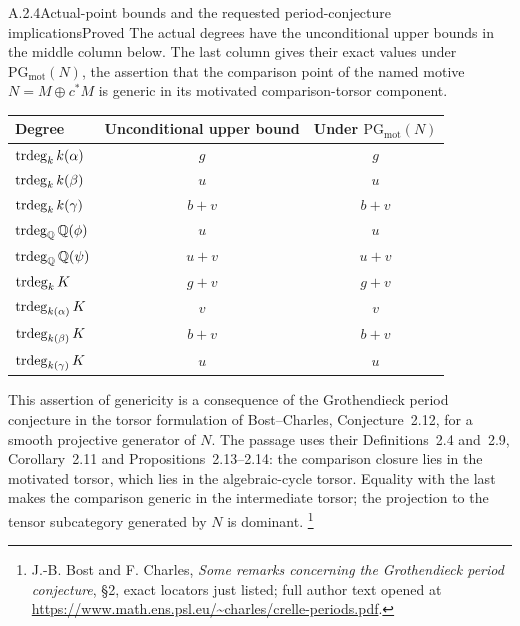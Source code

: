 \begin{result}{A.2.4}{Actual-point bounds and the requested period-conjecture implications}{Proved}
The actual degrees have the unconditional upper bounds in the middle
column below. The last column gives their exact values under
$\mathrm{PG}_{\mathrm{mot}}(N)$, the assertion that the comparison
point of the named motive $N=M\oplus c^*M$ is generic in its
motivated comparison-torsor component.
\begin{center}
\begin{tabular}{lcc}
\toprule
Degree&Unconditional upper bound&Under $\mathrm{PG}_{\mathrm{mot}}(N)$\\
\midrule
$\operatorname{trdeg}_k k(\alpha)$&$g$&$g$\\
$\operatorname{trdeg}_k k(\beta)$&$u$&$u$\\
$\operatorname{trdeg}_k k(\gamma)$&$b+v$&$b+v$\\
$\operatorname{trdeg}_{\mathbb Q}\mathbb Q(\phi)$&$u$&$u$\\
$\operatorname{trdeg}_{\mathbb Q}\mathbb Q(\psi)$&$u+v$&$u+v$\\
$\operatorname{trdeg}_k K$&$g+v$&$g+v$\\
$\operatorname{trdeg}_{k(\alpha)}K$&$v$&$v$\\
$\operatorname{trdeg}_{k(\beta)}K$&$b+v$&$b+v$\\
$\operatorname{trdeg}_{k(\gamma)}K$&$u$&$u$\\
\bottomrule
\end{tabular}
\end{center}
This assertion of genericity is a consequence of the Grothendieck
period conjecture in the torsor formulation of Bost--Charles,
Conjecture~2.12, for a smooth projective generator of $N$.
The passage uses their Definitions~2.4 and~2.9, Corollary~2.11 and
Propositions~2.13--2.14: the comparison closure lies in the motivated
torsor, which lies in the algebraic-cycle torsor. Equality with the
last makes the comparison generic in the intermediate torsor; the
projection to the tensor subcategory generated by $N$ is dominant.
\footnote{J.-B. Bost and F. Charles, \emph{Some remarks concerning the
Grothendieck period conjecture}, \S2, exact locators just listed; full
author text opened at
\url{https://www.math.ens.psl.eu/~charles/crelle-periods.pdf}.}
\end{result}

